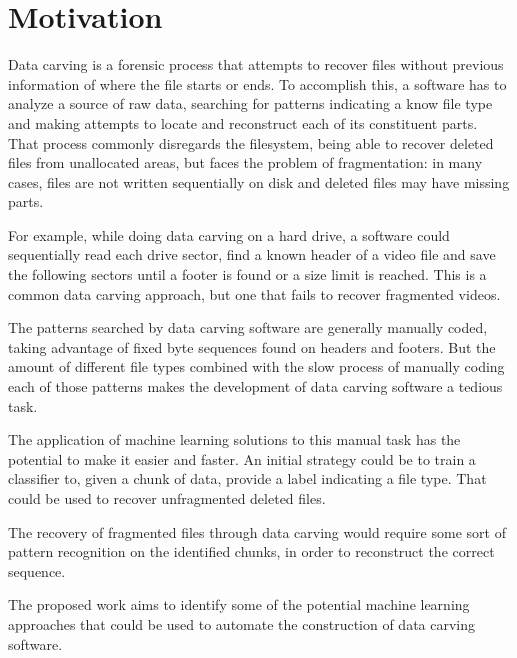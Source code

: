 \section{Motivation}


Data carving is a forensic process that attempts to recover files without previous information of where the file starts or ends.
To accomplish this, a software has to analyze a source of raw data, searching for patterns indicating a know file type and making attempts to locate and reconstruct each of its constituent parts.
That process commonly disregards the filesystem, being able to recover deleted files from unallocated areas, but faces the problem of fragmentation: in many cases, files are not written sequentially on disk and deleted files may have missing parts.

For example, while doing data carving on a hard drive, a software could sequentially read each drive sector, find a known header of a video file and save the following sectors until a footer is found or a size limit is reached. This is a common data carving approach, but one that fails to recover fragmented videos.

The patterns searched by data carving software are generally manually coded, taking advantage of fixed byte sequences found on headers and footers. But the amount of different file types combined with the slow process of manually coding each of those patterns makes the development of data carving software a tedious task.

The application of machine learning solutions to this manual task has the potential to make it easier and faster. An initial strategy could be to train a classifier to, given a chunk of data, provide a label indicating a file type. That could be used to recover unfragmented deleted files.

The recovery of fragmented files through data carving would require some sort of pattern recognition on the identified chunks, in order to reconstruct the correct sequence.

The proposed work aims to identify some of the potential machine learning approaches that could be used to automate the construction of data carving software.

